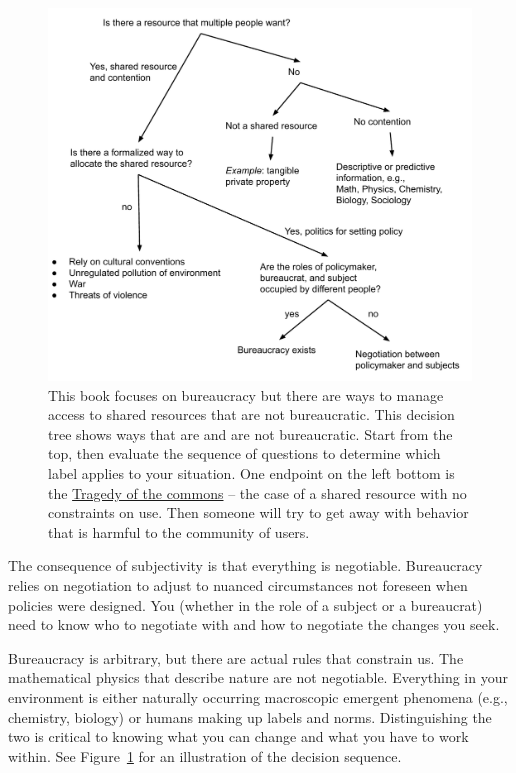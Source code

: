 \begin{figure}
    \centering
    \includegraphics[width=1.05\textwidth]{images/relation_between_shared_resource_and_bureaucarcy.pdf}
    \caption{This book focuses on bureaucracy but there are ways to manage access to shared resources that are not bureaucratic.  
    This decision tree shows ways that are and are not bureaucratic. Start from the top, then evaluate the sequence of questions to determine which label applies to your situation.
    One endpoint on the left bottom is the \href{https://en.wikipedia.org/wiki/Tragedy_of_the_commons}{Tragedy of the commons}  
    -- the case of a shared resource with no constraints on use. Then someone will try to get away with behavior that is harmful to the community of users. }
    \label{fig:am-I-a-bureaucrat}
\end{figure}

The consequence of subjectivity is that everything is negotiable. Bureaucracy relies on negotiation to adjust to nuanced circumstances not foreseen when policies were designed.  You (whether in the role of a subject or a bureaucrat) need to know who to negotiate with and how to negotiate the changes you seek. 

Bureaucracy is arbitrary, but there are actual rules that constrain us. The mathematical physics that describe nature are not negotiable. Everything in your environment is either naturally occurring macroscopic emergent phenomena (e.g., chemistry, biology) or humans making up labels and norms. Distinguishing the two is critical to knowing what you can change and what you have to work within. See Figure~\ref{fig:am-I-a-bureaucrat}\iftoggle{haspagenumbers}{ on page~\pageref{fig:am-I-a-bureaucrat}}{} for an illustration of the decision sequence.

